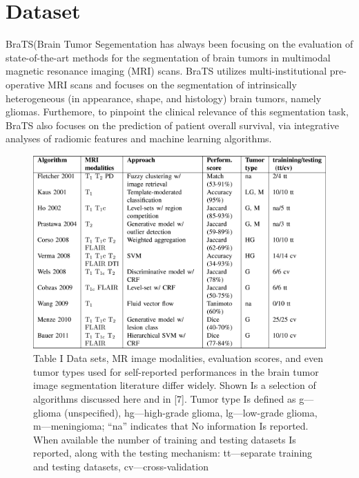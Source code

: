 
\chapter{Dataset} %

\label{Chapter2} %


BraTS(Brain Tumor Segementation has always been focusing on the evaluation of state-of-the-art methods for the segmentation of brain tumors in multimodal magnetic resonance imaging (MRI) scans. BraTS utilizes multi-institutional pre-operative MRI scans and focuses on the segmentation of intrinsically heterogeneous (in appearance, shape, and histology) brain tumors, namely gliomas. Furthemore, to pinpoint the clinical relevance of this segmentation task, BraTS also focuses on the prediction of patient overall survival, via integrative analyses of radiomic features and machine learning algorithms.

    \begin{figure}[h!]
        \centering
        \includegraphics[scale=0.5]{Figures/dataset1.png}
        \caption[Dataset Description With Approaches]{Table I Data sets, MR image modalities, evaluation scores, and even tumor types used for self-reported performances in the brain tumor image segmentation literature differ widely. Shown Is a selection of algorithms discussed here and in [7]. Tumor type Is defined as g—glioma (unspecified), hg—high-grade glioma, lg—low-grade glioma, m—meningioma; “na” indicates that No information Is reported. When available the number of training and testing datasets Is reported, along with the testing mechanism: tt—separate training and testing datasets, cv—cross-validation}
        \label{fig:my_label}
    \end{figure}

